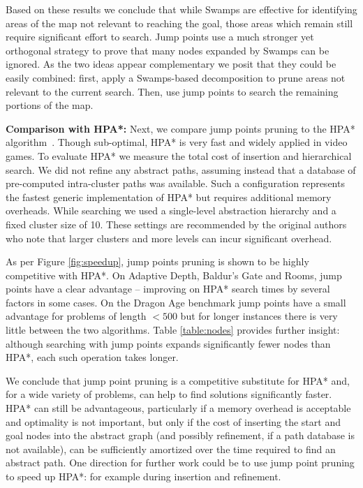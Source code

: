 Based on these results we conclude that while Swamps are effective for
identifying areas of the map not relevant to reaching the goal, those areas
which remain still require significant effort to search.  Jump points use a much
stronger yet orthogonal strategy to prove that many nodes expanded by Swamps can
be ignored.  As the two ideas appear complementary we posit that they could be
easily combined: first, apply a Swamps-based decomposition to prune areas not
relevant to the current search.  Then, use jump points to search the remaining
portions of the map.

\textbf{Comparison with HPA*: }
Next, we compare jump points pruning to the HPA* algorithm~\cite{botea04}.
Though sub-optimal, HPA* is very fast and widely applied in video games. 
To evaluate HPA* we measure the total cost
of insertion and hierarchical search. We did not refine any abstract paths,
assuming instead that a database of pre-computed intra-cluster paths was
available. Such a configuration represents the fastest generic implementation 
of HPA* but requires additional memory overheads. 
While searching we used a single-level abstraction hierarchy and a
fixed cluster size of 10.  These settings are recommended by the original
authors who note that larger clusters and more levels can incur
significant overhead.

As per Figure \ref{fig:speedup}, jump points pruning is shown to be 
highly competitive with HPA*.
On Adaptive Depth, Baldur's Gate and Rooms, jump points have a clear advantage
-- improving on HPA* search times by several factors in some cases.
On the Dragon Age benchmark jump points have a small advantage for problems of 
length $< 500$ but for longer instances there is very little between the two
algorithms.
Table \ref{table:nodes} provides further insight: although searching with jump 
points expands significantly fewer nodes than HPA*, each such operation
takes longer.

We conclude that jump point pruning is a competitive substitute for HPA* and,
for a wide variety of problems, can help to find solutions significantly faster.
HPA*
can still be advantageous, particularly if a memory overhead is acceptable
and optimality is not important, but only if the cost of inserting the start and
goal nodes into the abstract graph (and possibly refinement, if a path database
is not available), can be sufficiently amortized over the time required to find an abstract
path.
One direction for further work could be to use jump
point pruning to speed up HPA*: for example during insertion and refinement.

